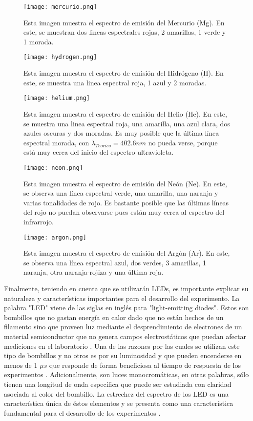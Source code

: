 \documentclass[%
 reprint,
 amsmath,amssymb,
 aps,
]{revtex4-1}
\begin{document}
\begin{figure}[H]
    \centering
    \texttt{[image: mercurio.png]}
    \caption{Esta imagen muestra el espectro de emisión del Mercurio (Mg). En este, se muestran dos lineas espectrales rojas, 2 amarillas, 1 verde y 1 morada.}
    \label{fig: Hg}
\end{figure}
\begin{figure}[H]
    \centering
    \texttt{[image: hydrogen.png]}
    \caption{Esta imagen muestra el espectro de emisión del Hidrógeno (H). En este, se muestra una linea espectral roja, 1 azul y 2 moradas. }
    \label{fig: H}
\end{figure}
\begin{figure}[H]
    \centering
    \texttt{[image: helium.png]}
    \caption{Esta imagen muestra el espectro de emisión del Helio (He). En este, se muestra una linea espectral roja, una amarilla, una azul clara, dos azules oscuras y dos moradas. Es muy posible que la última línea espectral morada, con $\lambda_{Teorico} = 402.6 nm$ no pueda verse, porque está muy cerca del inicio del espectro ultravioleta.}
    \label{fig: He}
\end{figure}
\begin{figure}[H]
    \centering
    \texttt{[image: neon.png]}
    \caption{Esta imagen muestra el espectro de emisión del Neón (Ne). En este, se observa una línea espectral verde, una amarilla, una naranja y varias tonalidades de rojo. Es bastante posible que las últimas líneas del rojo no puedan observarse pues están muy cerca al espectro del infrarrojo.}
    \label{fig: Ne}
\end{figure}

\begin{figure}[H]
    \centering
    \texttt{[image: argon.png]}
    \caption{Esta imagen muestra el espectro de emisión del Argón (Ar). En este, se observa una línea espectral azul, dos verdes, 3 amarillas, 1 naranja, otra naranja-rojiza y una última roja.}
    \label{fig: Ar}
\end{figure}


Finalmente, teniendo en cuenta que se utilizarán LEDs, es importante explicar su naturaleza y características importantes para el desarrollo del experimento. La palabra "LED" viene de las siglas en inglés para "light-emitting diodes". Estos son bombillos que no gastan energía en calor dado que no están hechos de un filamento sino que proveen luz mediante el desprendimiento de electrones de un material semiconductor que no genera campos electrostáticos que puedan afectar mediciones en el laboratorio \cite{Leds_semiconductores}. Una de las razones por las cuales se utilizan este tipo de bombillos y no otros es por su luminosidad y que pueden encenderse en menos de 1 $\mu s$ que responde de forma beneficiosa al tiempo de respuesta de los experimentos \cite{LEDs}. Adicionalmente, son luces monocromáticas, en otras palabras, sólo tienen una longitud de onda específica que puede ser estudiada con claridad asociada al color del bombillo. La estrechez del espectro de los LED es una característica única de éstos elementos y se presenta como una característica fundamental para el desarrollo de los experimentos \cite{LED_monocromatico}.
\\
\end{document}
